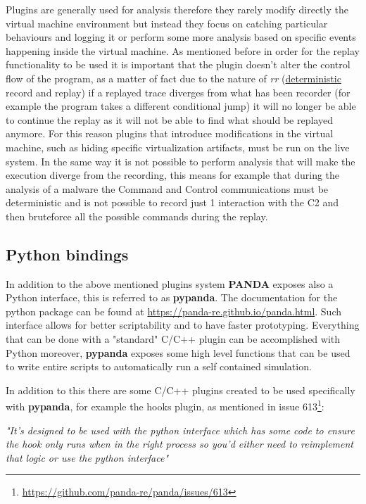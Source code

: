 Plugins are generally used for analysis therefore they rarely modify directly the virtual machine environment but instead they focus on catching particular behaviours and logging it or perform some more analysis based on specific events happening inside the virtual machine. As mentioned before in order for the replay functionality to be used it is important that the plugin doesn't alter the control flow of the program, as a matter of fact due to the nature of \textit{rr} (\underline{deterministic} record and replay) if a replayed trace diverges from what has been recorder (for example the program takes a different conditional jump) it will no longer be able to continue the replay as it will not be able to find what should be replayed anymore. For this reason plugins that introduce modifications in the virtual machine, such as hiding specific virtualization artifacts, must be run on the live system. In the same way it is not possible to perform analysis that will make the execution diverge from the recording, this means for example that during the analysis of a malware the Command and Control communications must be deterministic and is not possible to record just 1 interaction with the C2 and then bruteforce all the possible commands during the replay.


\subsection{Python bindings}

In addition to the above mentioned plugins system \textbf{PANDA} exposes also a Python interface, this is referred to as \textbf{pypanda}. The documentation for the python package can be found at \url{https://panda-re.github.io/panda.html}. Such interface allows for better scriptability and to have faster prototyping. Everything that can be done with a "standard" C/C++ plugin can be accomplished with Python moreover, \textbf{pypanda} exposes some high level functions that can be used to write entire scripts to automatically run a self contained simulation.

In addition to this there are some C/C++ plugins created to be used specifically with \textbf{pypanda}, for example the hooks plugin, as mentioned in issue 613\footnote{\url{https://github.com/panda-re/panda/issues/613}}:

\textit{"It's designed to be used with the python interface which has some code to ensure the hook only runs when in the right process so you'd either need to reimplement that logic or use the python interface"}

